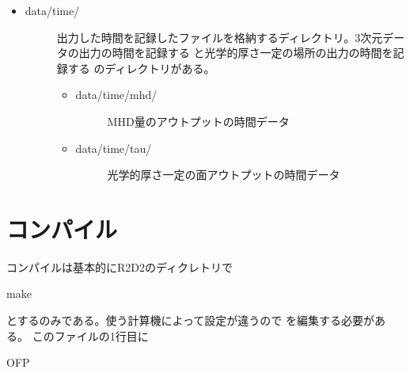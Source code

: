\documentclass[letterpaper,10pt,dvipdfmx,report]{sphinxmanual}
\begin{document}
\begin{itemize}
\begin{description}
\begin{itemize}
\begin{description}
\end{description}

\item {} \begin{description}
\item[{data/time/}] \leavevmode
出力した時間を記録したファイルを格納するディレクトリ。3次元データの出力の時間を記録する  と光学的厚さ一定の場所の出力の時間を記録する  のディレクトリがある。
\begin{itemize}
\item {} \begin{description}
\item[{data/time/mhd/}] \leavevmode
MHD量のアウトプットの時間データ

\end{description}

\item {} \begin{description}
\item[{data/time/tau/}] \leavevmode
光学的厚さ一定の面アウトプットの時間データ

\end{description}

\end{itemize}

\end{description}

\end{itemize}

\end{description}

\end{itemize}


\section{コンパイル}
\label{\detokenize{start:id2}}
コンパイルは基本的にR2D2のディクレトリで

\begin{sphinxVerbatim}[commandchars=\\\{\}]
make
\end{sphinxVerbatim}

とするのみである。使う計算機によって設定が違うので  を編集する必要がある。
このファイルの1行目に

\begin{sphinxVerbatim}[commandchars=\\\{\}]
OFP
\end{sphinxVerbatim}
\end{document}
